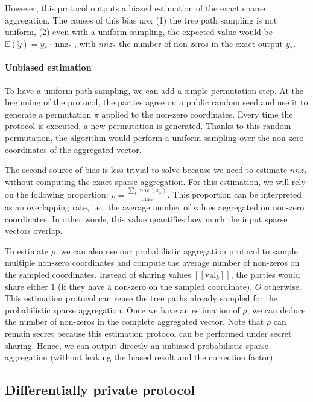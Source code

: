 \documentclass[sigconf,balance=false]{acmart}
\newcommand{\share}[1]{[\![#1]\!]}
\DeclareMathOperator{\nnz}{nnz}
\begin{document}
However, this protocol outputs a biased estimation of the exact sparse aggregation.
The causes of this bias are: (1) the tree path sampling is not uniform, (2) even with a uniform sampling, the expected value would be $\mathbb{E}(\widetilde{y}) = y_*\cdot \nnz_*$, with $nnz_*$ the number of non-zeros in the exact output $y_*$.


\paragraph{Unbiased estimation}

To have a uniform path sampling, we can add a simple permutation step.
At the beginning of the protocol, the parties agree on a public random seed and use it to generate a permutation $\pi$ applied to the non-zero coordinates.
Every time the protocol is executed, a new permutation is generated.
Thanks to this random permutation, the algorithm would perform a uniform sampling over the non-zero coordinates of the aggregated vector.

The second source of bias is less trivial to solve because we need to estimate $nnz_*$ without computing the exact sparse aggregation.
For this estimation, we will rely on the following proportion: $\rho = \frac{{\sum_k \nnz(x_k)}}{\nnz_*}$.
This proportion can be interpreted as an overlapping rate, i.e., the average number of values aggregated on non-zero coordinates.
In other words, this value quantifies how much the input sparse vectors overlap.

To estimate $\rho$, we can also use our probabilistic aggregation protocol to sample multiple non-zero coordinates and compute the average number of non-zeros on the sampled coordinates.
Instead of sharing values $\share{\text{val}_k}$, the parties would share either $1$ (if they have a non-zero on the sampled coordinate), $O$ otherwise.
This estimation protocol can reuse the tree paths already sampled for the probabilistic sparse aggregation.
Once we have an estimation of $\rho$, we can deduce the number of non-zeros in the complete aggregated vector.
Note that $\rho$ can remain secret because this estimation protocol can be performed under secret sharing.
Hence, we can output directly an unbiased probabilistic sparse aggregation (without leaking the biased result and the correction factor).

\subsection{Differentially private protocol}
\end{document}

